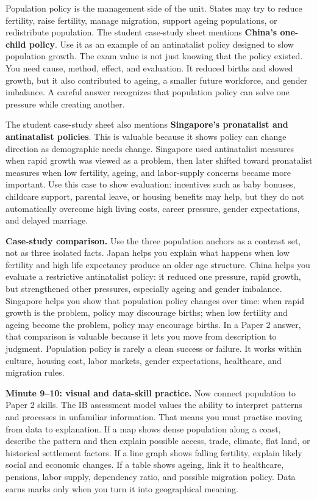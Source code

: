 \documentclass[11pt,a4paper]{article}
\newcommand{\term}[1]{\textcolor{HeadingBlue}{\textbf{#1}}}
\begin{document}
Population policy is the management side of the unit. States may try to reduce
fertility, raise fertility, manage migration, support ageing populations, or
redistribute population. The student case-study sheet mentions \term{China's
one-child policy}. Use it as an example of an antinatalist policy designed to
slow population growth. The exam value is not just knowing that the policy
existed. You need cause, method, effect, and evaluation. It reduced births and
slowed growth, but it also contributed to ageing, a smaller future workforce,
and gender imbalance. A careful answer recognizes that population policy can
solve one pressure while creating another.

The student case-study sheet also mentions \term{Singapore's pronatalist and
antinatalist policies}. This is valuable because it shows policy can change
direction as demographic needs change. Singapore used antinatalist measures when
rapid growth was viewed as a problem, then later shifted toward pronatalist
measures when low fertility, ageing, and labor-supply concerns became more
important. Use this case to show evaluation: incentives such as baby bonuses,
childcare support, parental leave, or housing benefits may help, but they do not
automatically overcome high living costs, career pressure, gender expectations,
and delayed marriage.

\textbf{Case-study comparison.}
Use the three population anchors as a contrast set, not as three isolated facts.
Japan helps you explain what happens when low fertility and high life expectancy
produce an older age structure. China helps you evaluate a restrictive
antinatalist policy: it reduced one pressure, rapid growth, but strengthened
other pressures, especially ageing and gender imbalance. Singapore helps you
show that population policy changes over time: when rapid growth is the problem,
policy may discourage births; when low fertility and ageing become the problem,
policy may encourage births. In a Paper 2 answer, that comparison is valuable
because it lets you move from description to judgment. Population policy is
rarely a clean success or failure. It works within culture, housing cost, labor
markets, gender expectations, healthcare, and migration rules.

\textbf{Minute 9--10: visual and data-skill practice.}
Now connect population to Paper 2 skills. The IB assessment model values the
ability to interpret patterns and processes in unfamiliar information. That
means you must practise moving from data to explanation. If a map shows dense
population along a coast, describe the pattern and then explain possible access,
trade, climate, flat land, or historical settlement factors. If a line graph
shows falling fertility, explain likely social and economic changes. If a table
shows ageing, link it to healthcare, pensions, labor supply, dependency ratio,
and possible migration policy. Data earns marks only when you turn it into
geographical meaning.
\end{document}
